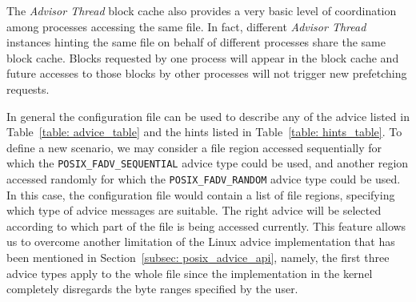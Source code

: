 The \textit{Advisor Thread} block cache also provides a very basic level of coordination among processes accessing the same file. In fact, different \textit{Advisor Thread} instances hinting the same file on behalf of different processes share the same block cache. Blocks requested by one process will appear in the block cache and future accesses to those blocks by other processes will not trigger new prefetching requests.


In general the configuration file can be used to describe any of the advice listed in Table~\ref{table: advice_table} and the hints listed in Table~\ref{table: hints_table}. To define a new scenario, we may consider a file region accessed sequentially for which the \texttt{POSIX\_FADV\_SEQUENTIAL} advice type could be used, and another region accessed randomly for which the \texttt{POSIX\_FADV\_RANDOM} advice type could be used. In this case, the configuration file would contain a list of file regions, specifying which type of advice messages are suitable. The right advice will be selected according to which part of the file is being accessed currently. This feature allows us to overcome another limitation of the Linux advice implementation that has been mentioned in Section~\ref{subsec: posix_advice_api}, namely, the first three advice types apply to the whole file since the implementation in the kernel completely disregards the byte ranges specified by the user.
 
